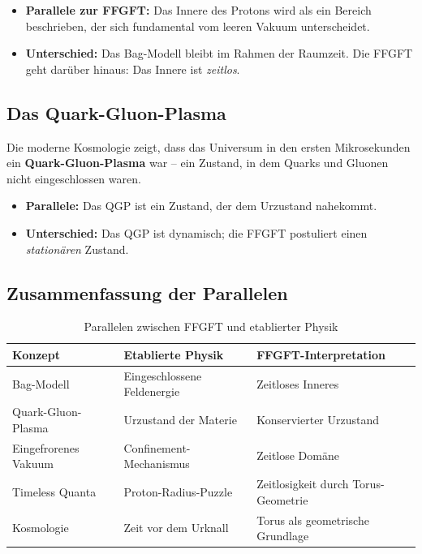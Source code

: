 \documentclass[11pt,a4paper]{article}
\begin{document}
	\begin{itemize}
		\item \textbf{Parallele zur FFGFT:} Das Innere des Protons wird als ein Bereich beschrieben, der sich fundamental vom leeren Vakuum unterscheidet.
		\item \textbf{Unterschied:} Das Bag-Modell bleibt im Rahmen der Raumzeit. Die FFGFT geht darüber hinaus: Das Innere ist \emph{zeitlos}.
	\end{itemize}
	
	\subsection{Das Quark-Gluon-Plasma}
	
	Die moderne Kosmologie zeigt, dass das Universum in den ersten Mikrosekunden ein \textbf{Quark-Gluon-Plasma} war -- ein Zustand, in dem Quarks und Gluonen nicht eingeschlossen waren.
	
	\begin{itemize}
		\item \textbf{Parallele:} Das QGP ist ein Zustand, der dem Urzustand nahekommt.
		\item \textbf{Unterschied:} Das QGP ist dynamisch; die FFGFT postuliert einen \emph{stationären} Zustand.
	\end{itemize}
	
	\subsection{Zusammenfassung der Parallelen}
	
	\begin{table}[ht]
		\centering
		\caption{Parallelen zwischen FFGFT und etablierter Physik}
		\label{tab:querverweise}
		\begin{tabular}{lll}
			\toprule
			Konzept & Etablierte Physik & FFGFT-Interpretation \\
			\midrule
			Bag-Modell & Eingeschlossene Feldenergie & Zeitloses Inneres \\
			Quark-Gluon-Plasma & Urzustand der Materie & Konservierter Urzustand \\
			Eingefrorenes Vakuum & Confinement-Mechanismus & Zeitlose Domäne \\
			Timeless Quanta & Proton-Radius-Puzzle & Zeitlosigkeit durch Torus-Geometrie \\
			Kosmologie & Zeit vor dem Urknall & Torus als geometrische Grundlage \\
			\bottomrule
		\end{tabular}
	\end{table}
	
\end{document}
